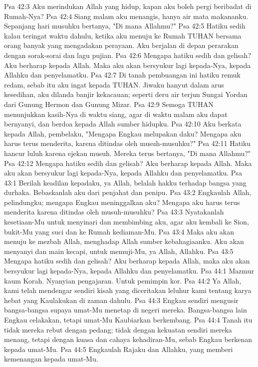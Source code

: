 Psa 42:3  Aku merindukan Allah yang hidup, kapan aku boleh pergi beribadat di Rumah-Nya?
Psa 42:4  Siang malam aku menangis, hanya air mata makananku. Sepanjang hari musuhku bertanya, "Di mana Allahmu?"
Psa 42:5  Hatiku sedih kalau teringat waktu dahulu, ketika aku menuju ke Rumah TUHAN bersama orang banyak yang mengadakan perayaan. Aku berjalan di depan perarakan dengan sorak-sorai dan lagu pujian.
Psa 42:6  Mengapa hatiku sedih dan gelisah? Aku berharap kepada Allah. Maka aku akan bersyukur lagi kepada-Nya, kepada Allahku dan penyelamatku.
Psa 42:7  Di tanah pembuangan ini hatiku remuk redam, sebab itu aku ingat kepada TUHAN. Jiwaku hanyut dalam arus kesedihan, aku dilanda banjir kekacauan; seperti deru air terjun Sungai Yordan dari Gunung Hermon dan Gunung Mizar.
Psa 42:9  Semoga TUHAN menunjukkan kasih-Nya di waktu siang, agar di waktu malam aku dapat bernyanyi, dan berdoa kepada Allah sumber hidupku.
Psa 42:10  Aku berkata kepada Allah, pembelaku, "Mengapa Engkau melupakan daku? Mengapa aku harus terus menderita, karena ditindas oleh musuh-musuhku?"
Psa 42:11  Hatiku hancur luluh karena ejekan musuh. Mereka terus bertanya, "Di mana Allahmu?"
Psa 42:12  Mengapa hatiku sedih dan gelisah? Aku berharap kepada Allah. Maka aku akan bersyukur lagi kepada-Nya, kepada Allahku dan penyelamatku.
Psa 43:1  Berilah keadilan kepadaku, ya Allah, belalah hakku terhadap bangsa yang durhaka. Bebaskanlah aku dari penjahat dan penipu.
Psa 43:2  Engkaulah Allah, pelindungku; mengapa Engkau meninggalkan aku? Mengapa aku harus terus menderita karena ditindas oleh musuh-musuhku?
Psa 43:3  Nyatakanlah kesetiaan-Mu untuk menyinari dan membimbing aku, agar aku kembali ke Sion, bukit-Mu yang suci dan ke Rumah kediaman-Mu.
Psa 43:4  Maka aku akan menuju ke mezbah Allah, menghadap Allah sumber kebahagiaanku. Aku akan menyanyi dan main kecapi, untuk memuji-Mu, ya Allah, Allahku.
Psa 43:5  Mengapa hatiku sedih dan gelisah? Aku berharap kepada Allah, maka aku akan bersyukur lagi kepada-Nya, kepada Allahku dan penyelamatku.
Psa 44:1  Mazmur kaum Korah. Nyanyian pengajaran. Untuk pemimpin kor.
Psa 44:2  Ya Allah, kami telah mendengar sendiri kisah yang diceritakan leluhur kami tentang karya hebat yang Kaulakukan di zaman dahulu.
Psa 44:3  Engkau sendiri mengusir bangsa-bangsa supaya umat-Mu menetap di negeri mereka. Bangsa-bangsa lain Engkau celakakan, tetapi umat-Mu Kaubiarkan berkembang.
Psa 44:4  Tanah itu tidak mereka rebut dengan pedang; tidak dengan kekuatan sendiri mereka menang, tetapi dengan kuasa dan cahaya kehadiran-Mu, sebab Engkau berkenan kepada umat-Mu.
Psa 44:5  Engkaulah Rajaku dan Allahku, yang memberi kemenangan kepada umat-Mu.
